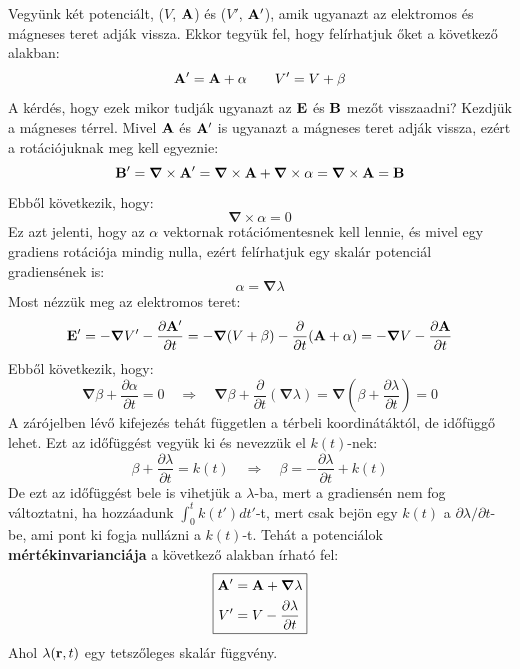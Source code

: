 \documentclass[a4paper,12pt]{article}
\begin{document}
Vegyünk két potenciált, ($V$, $\bold{A}$) és ($V'$, $\bold{A}'$), amik ugyanazt az elektromos és mágneses teret adják vissza. Ekkor tegyük fel, hogy felírhatjuk őket a következő alakban:
\begin{equation}
    \bold{A}' = \bold{A} + \alpha \qquad V' = V + \beta
\end{equation}
A kérdés, hogy ezek mikor tudják ugyanazt az $\bold{E}$ és $\bold{B}$ mezőt visszaadni? Kezdjük a mágneses térrel. Mivel $\bold{A}$ és $\bold{A}'$ is ugyanazt a mágneses teret adják vissza, ezért a rotációjuknak meg kell egyeznie:
\begin{equation}
    \bold{B}' = \boldsymbol{\nabla} \times \bold{A}' = \boldsymbol{\nabla} \times \bold{A} + \boldsymbol{\nabla} \times \alpha = \boldsymbol{\nabla} \times \bold{A} = \bold{B}
\end{equation}
Ebből következik, hogy:
\begin{equation}
    \boldsymbol{\nabla} \times \alpha = 0
\end{equation}
Ez azt jelenti, hogy az $\alpha$ vektornak rotációmentesnek kell lennie, és mivel egy gradiens rotációja mindig nulla, ezért felírhatjuk egy skalár potenciál gradiensének is:
\begin{equation}
    \alpha = \boldsymbol{\nabla} \lambda
\end{equation}
Most nézzük meg az elektromos teret:
\begin{equation}
    \bold{E}' = - \boldsymbol{\nabla} V' - \frac{\partial \bold{A}'}{\partial t} = - \boldsymbol{\nabla} (V + \beta) - \frac{\partial }{\partial t} (\bold{A} + \alpha) = - \boldsymbol{\nabla} V - \frac{\partial \bold{A}}{\partial t}
\end{equation}
Ebből következik, hogy:
\begin{equation}
    \boldsymbol{\nabla} \beta + \frac{\partial \alpha}{\partial t} = 0 \quad \Rightarrow \quad \boldsymbol{\nabla} \beta + \frac{\partial }{\partial t} (\boldsymbol{\nabla} \lambda) = \boldsymbol{\nabla} (\beta + \frac{\partial \lambda}{\partial t}) = 0
\end{equation}
A zárójelben lévő kifejezés tehát független a térbeli koordinátáktól, de időfüggő lehet. Ezt az időfüggést vegyük ki és nevezzük el $k(t)$-nek:
\begin{equation}
    \beta + \frac{\partial \lambda}{\partial t} = k(t) \quad \Rightarrow \quad \beta = - \frac{\partial \lambda}{\partial t} + k(t)
\end{equation}
De ezt az időfüggést bele is vihetjük a $\lambda$-ba, mert a gradiensén nem fog változtatni, ha hozzáadunk $\int_{0}^{t} k(t') dt'$-t, mert csak bejön egy $k(t)$ a $\partial \lambda / \partial t$-be, ami pont ki fogja nullázni a $k(t)$-t.
Tehát a potenciálok \textbf{mértékinvarianciája} a következő alakban írható fel:
\begin{equation}
    \boxed{\begin{aligned}
        \bold{A}' &= \bold{A} + \boldsymbol{\nabla} \lambda \\
        V' &= V - \frac{\partial \lambda}{\partial t}
    \end{aligned}}
\end{equation}
Ahol $\lambda(\bold{r},t)$ egy tetszőleges skalár függvény. 
\end{document}
